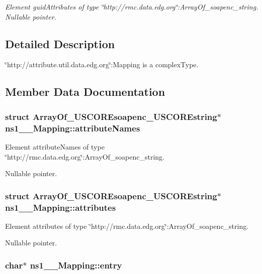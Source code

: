 \begin{CompactItemize}
\begin{CompactList}\small\item\em Element guid\-Attributes of type \char`\"{}http://rmc.data.edg.org\char`\"{}:Array\-Of\_\-soapenc\_\-string. Nullable pointer. \item\end{CompactList}\end{CompactItemize}


\subsection{Detailed Description}
\char`\"{}http://attribute.util.data.edg.org\char`\"{}:Mapping is a complex\-Type. 



\subsection{Member Data Documentation}
\subsubsection{\setlength{\rightskip}{0pt plus 5cm}struct \bf{Array\-Of\_\-USCOREsoapenc\_\-USCOREstring}$\ast$ \bf{ns1\_\-\_\-Mapping::attribute\-Names}}\label{structns1____Mapping_1e9799ca189f20b337768ee4233948ee}


Element attribute\-Names of type \char`\"{}http://rmc.data.edg.org\char`\"{}:Array\-Of\_\-soapenc\_\-string. 

Nullable pointer. 
\subsubsection{\setlength{\rightskip}{0pt plus 5cm}struct \bf{Array\-Of\_\-USCOREsoapenc\_\-USCOREstring}$\ast$ \bf{ns1\_\-\_\-Mapping::attributes}}\label{structns1____Mapping_8095d927d5e70c759cf8c7a7e7df9623}


Element attributes of type \char`\"{}http://rmc.data.edg.org\char`\"{}:Array\-Of\_\-soapenc\_\-string. 

Nullable pointer. 
\subsubsection{\setlength{\rightskip}{0pt plus 5cm}char$\ast$ \bf{ns1\_\-\_\-Mapping::entry}}\label{structns1____Mapping_aa1a2dbb201e59a114d0488a64c01862}


